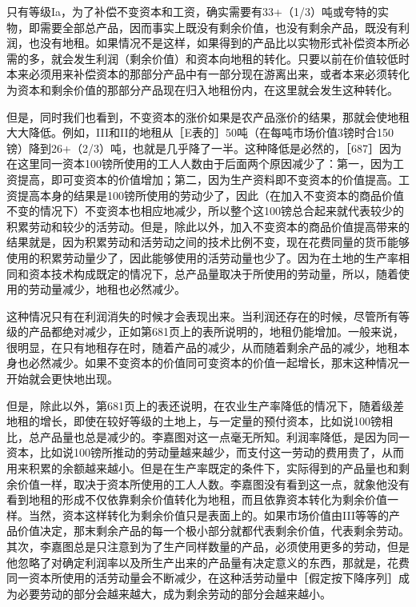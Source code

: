 只有等级Ia，为了补偿不变资本和工资，确实需要有33+（1/3）吨或夸特的实物，即需要全部总产品，因而事实上既没有剩余价值，也没有剩余产品，既没有利润，也没有地租。如果情况不是这样，如果得到的产品比以实物形式补偿资本所必需的多，就会发生利润（剩余价值）和资本向地租的转化。只要以前在价值较低时本来必须用来补偿资本的那部分产品中有一部分现在游离出来，或者本来必须转化为资本和剩余价值的那部分产品现在归入地租份内，在这里就会发生这种转化。

但是，同时我们也看到，不变资本的涨价如果是农产品涨价的结果，那就会使地租大大降低。例如，III和II的地租从［E表的］50吨（在每吨市场价值3镑时合150镑）降到26+（2/3）吨，也就是几乎降了一半。这种降低是必然的，［687］因为在这里同一资本100镑所使用的工人人数由于后面两个原因减少了：第一，因为工资提高，即可变资本的价值增加；第二，因为生产资料即不变资本的价值提高。工资提高本身的结果是100镑所使用的劳动少了，因此（在加入不变资本的商品价值不变的情况下）不变资本也相应地减少，所以整个这100镑总合起来就代表较少的积累劳动和较少的活劳动。但是，除此以外，加入不变资本的商品价值提高带来的结果就是，因为积累劳动和活劳动之间的技术比例不变，现在花费同量的货币能够使用的积累劳动量少了，因此能够使用的活劳动量也少了。因为在土地的生产率相同和资本技术构成既定的情况下，总产品量取决于所使用的劳动量，所以，随着使用的劳动量减少，地租也必然减少。

这种情况只有在利润消失的时候才会表现出来。当利润还存在的时候，尽管所有等级的产品都绝对减少，正如第681页上的表所说明的，地租仍能增加。一般来说，很明显，在只有地租存在时，随着产品的减少，从而随着剩余产品的减少，地租本身也必然减少。如果不变资本的价值同可变资本的价值一起增长，那末这种情况一开始就会更快地出现。

但是，除此以外，第681页上的表还说明，在农业生产率降低的情况下，随着级差地租的增长，即使在较好等级的土地上，与一定量的预付资本，比如说100镑相比，总产品量也总是减少的。李嘉图对这一点毫无所知。利润率降低，是因为同一资本，比如说100镑所推动的劳动量越来越少，而支付这一劳动的费用贵了，从而用来积累的余额越来越小。但是在生产率既定的条件下，实际得到的产品量也和剩余价值一样，取决于资本所使用的工人人数。李嘉图没有看到这一点，就象他没有看到地租的形成不仅依靠剩余价值转化为地租，而且依靠资本转化为剩余价值一样。当然，资本这样转化为剩余价值只是表面上的。如果市场价值由III等等的产品价值决定，那末剩余产品的每一个极小部分就都代表剩余价值，代表剩余劳动。其次，李嘉图总是只注意到为了生产同样数量的产品，必须使用更多的劳动，但是他忽略了对确定利润率以及所生产出来的产品量有决定意义的东西，那就是，花费同一资本所使用的活劳动量会不断减少，在这种活劳动量中［假定按下降序列］成为必要劳动的部分会越来越大，成为剩余劳动的部分会越来越小。

